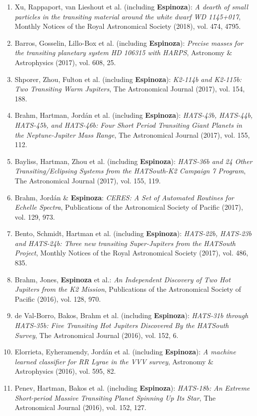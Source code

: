 \documentclass[12pt, a4paper]{article} %
\begin{document}
\begin{flushleft}
\begin{enumerate}
\item Xu, Rappaport, van Lieshout et al. (including \textbf{Espinoza}): \textit{A dearth of small particles in the transiting material around the white dwarf WD 1145+017}, Monthly Notices of the Royal Astronomical Society (2018), vol. 474, 4795.
\item Barros, Gosselin, Lillo-Box et al. (including \textbf{Espinoza}): \textit{Precise masses for the transiting planetary system HD 106315 with HARPS}, Astronomy \& Astrophysics (2017), vol. 608, 25.
\item Shporer, Zhou, Fulton et al. (including \textbf{Espinoza}): \textit{K2-114b and K2-115b: Two Transiting Warm Jupiters}, The Astronomical Journal (2017), vol. 154, 188.
\item Brahm, Hartman, Jord\'an et al. (including \textbf{Espinoza}): \textit{HATS-43b, HATS-44b, HATS-45b, and HATS-46b: Four Short Period Transiting Giant Planets in the Neptune-Jupiter Mass Range}, The Astronomical Journal (2017), vol. 155, 112.
\item Bayliss, Hartman, Zhou et al. (including \textbf{Espinoza}): \textit{HATS-36b and 24 Other Transiting/Eclipsing Systems from the HATSouth-K2 Campaign 7 Program}, The Astronomical Journal (2017), vol. 155, 119.
\item Brahm, Jord\'an \& \textbf{Espinoza}: \textit{CERES: A Set of Automated Routines for Echelle Spectra}, Publications of the 
Astronomical Society of Pacific (2017), vol. 129, 973.
\item Bento, Schmidt, Hartman et al. (including \textbf{Espinoza}): \textit{HATS-22b, HATS-23b and HATS-24b: Three new transiting Super-Jupiters from the HATSouth Project}, Monthly Notices of the Royal Astronomical Society (2017), vol. 486, 835.
\item Brahm, Jones, \textbf{Espinoza} et al.: \textit{An Independent Discovery of Two Hot Jupiters from the K2 Mission}, 
Publications of the Astronomical Society of Pacific (2016), vol. 128, 970.
\item de Val-Borro, Bakos, Brahm et al. (including \textbf{Espinoza}): \textit{HATS-31b through HATS-35b: Five Transiting Hot Jupiters Discovered By the HATSouth Survey}, The Astronomical Journal (2016), vol. 152, 6.
\item Elorrieta, Eyheramendy, Jord\'an et al. (including \textbf{Espinoza}): \textit{A machine learned classifier for RR Lyrae in the 
VVV survey}, Astronomy \& Astrophysics (2016), vol. 595, 82.
\item Penev, Hartman, Bakos et al. (including \textbf{Espinoza}): \textit{HATS-18b: An Extreme Short-period Massive Transiting Planet Spinning Up Its Star}, The Astronomical Journal (2016), vol. 152, 127.

\end{enumerate}
\end{flushleft}
\end{document}

